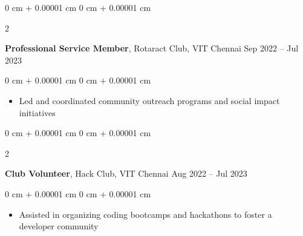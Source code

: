 \documentclass[10pt, letterpaper]{article}
\newenvironment{highlights}{
    \begin{itemize}[
        topsep=0.10 cm,
        parsep=0.10 cm,
        partopsep=0pt,
        itemsep=0pt,
        leftmargin=0 cm + 10pt
    ]
}{
    \end{itemize}
} %
\newenvironment{onecolentry}{
    \begin{adjustwidth}{
        0 cm + 0.00001 cm
    }{
        0 cm + 0.00001 cm
    }
}{
    \end{adjustwidth}
} %
\newenvironment{twocolentry}[2][]{
    \onecolentry
    \def\secondColumn{#2}
    \setcolumnwidth{\fill, 4.5 cm}
    \begin{paracol}{2}
}{
    \switchcolumn \raggedleft \secondColumn
    \end{paracol}
    \endonecolentry
} %
\begin{document}
        \begin{twocolentry}{
            Sep 2022 – Jul 2023 
        }
            \textbf{Professional Service Member}, Rotaract Club, VIT Chennai \end{twocolentry}

        \vspace{0.10 cm}
        \begin{onecolentry}
            \begin{highlights}
                \item Led and coordinated community outreach programs and social impact initiatives 
            \end{highlights}
        \end{onecolentry}
         \vspace{0.2 cm}
        
        \begin{twocolentry}{
            Aug 2022 – Jul 2023 
        }
            \textbf{Club Volunteer}, Hack Club, VIT Chennai \end{twocolentry}

        \vspace{0.10 cm}
        \begin{onecolentry}
            \begin{highlights}
                \item Assisted in organizing coding bootcamps and hackathons to foster a developer community 
            \end{highlights}
        \end{onecolentry}
\end{document}
